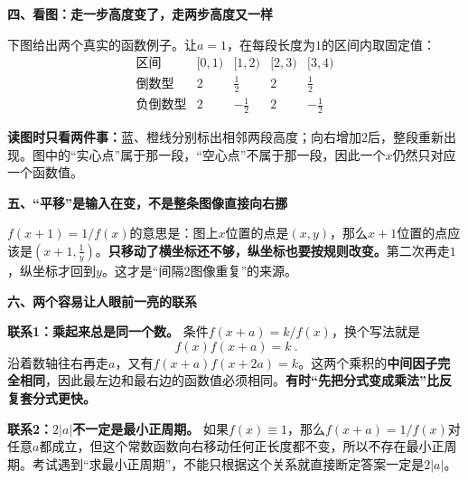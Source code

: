 \begin{explanationbox}
\textbf{\textcolor{CExplanation}{四、看图：走一步高度变了，走两步高度又一样}}



下图给出两个真实的函数例子。让$a=1$，在每段长度为$1$的区间内取固定值：
\[
\begin{array}{c|cccc}
 \text{区间}&[0,1)&[1,2)&[2,3)&[3,4)\\ \hline
 \text{倒数型}&2&\frac12&2&\frac12\\
 \text{负倒数型}&2&-\frac12&2&-\frac12
\end{array}
\]

\end{explanationbox}\clearpage\begin{explanationbox}

\textbf{读图时只看两件事：}蓝、橙线分别标出相邻两段高度；向右增加2后，整段重新出现。图中的“实心点”属于那一段，“空心点”不属于那一段，因此一个$x$仍然只对应一个函数值。

\medskip

\end{explanationbox}
\clearpage
\begin{explanationbox}
\textbf{\textcolor{CExplanation}{五、“平移”是输入在变，不是整条图像直接向右挪}}



$f(x+1)=1/f(x)$的意思是：图上$x$位置的点是$(x,y)$，那么$x+1$位置的点应该是$\left(x+1,\frac1y\right)$。\textbf{只移动了横坐标还不够，纵坐标也要按规则改变。}第二次再走$1$，纵坐标才回到$y$。这才是“间隔$2$图像重复”的来源。

\medskip

\end{explanationbox}
\clearpage
\begin{explanationbox}
\textbf{\textcolor{CExplanation}{六、两个容易让人眼前一亮的联系}}



\textbf{联系1：乘起来总是同一个数。}
条件$f(x+a)=k/f(x)$，换个写法就是
\[
\boxed{\ f(x)f(x+a)=k\ }.
\]
沿着数轴往右再走$a$，又有$f(x+a)f(x+2a)=k$。这两个乘积的\textbf{中间因子完全相同}，因此最左边和最右边的函数值必须相同。\textbf{有时“先把分式变成乘法”比反复套分式更快。}

\end{explanationbox}\clearpage\begin{explanationbox}

\textbf{联系2：$2|a|$不一定是最小正周期。}
如果$f(x)\equiv1$，那么$f(x+a)=1/f(x)$对任意$a$都成立，但这个常数函数向右移动任何正长度都不变，所以不存在最小正周期。考试遇到“求最小正周期”，不能只根据这个关系就直接断定答案一定是$2|a|$。

\medskip

\end{explanationbox}
